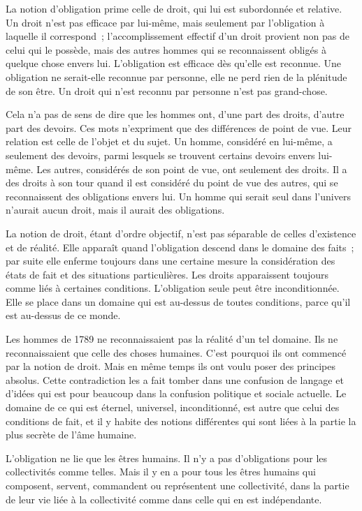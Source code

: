 \documentclass[french,twoside]{book} %
\begin{document}
\noindent La notion d'obligation prime celle de droit, qui lui est subordonnée et relative. Un droit n'est pas efficace par lui-même, mais seulement par l'obligation à laquelle il correspond ; l'accomplissement effectif d'un droit provient non pas de celui qui le possède, mais des autres hommes qui se reconnaissent obligés à quelque chose envers lui. L'obligation est efficace dès qu'elle est reconnue. Une obligation ne serait-elle reconnue par personne, elle ne perd rien de la plénitude de son être. Un droit qui n'est reconnu par personne n'est pas grand-chose.\par
Cela n'a pas de sens de dire que les hommes ont, d'une part des droits, d'autre part des devoirs. Ces mots n'expriment que des différences de point de vue. Leur relation est celle de l'objet et du sujet. Un homme, considéré en lui-même, a seulement des devoirs, parmi lesquels se trouvent certains devoirs envers lui-même. Les autres, considérés de son point de vue, ont seulement des droits. Il a des droits à son tour quand il est considéré du point de vue des autres, qui se reconnaissent des obligations envers lui. Un homme qui serait seul dans l'univers n'aurait aucun droit, mais il aurait des obligations.\par
La notion de droit, étant d'ordre objectif, n'est pas séparable de celles d'existence et de réalité. Elle apparaît quand l'obligation descend dans le domaine des faits ; par suite elle enferme toujours dans une certaine mesure la considération des états de fait et des situations particulières. Les droits apparaissent toujours comme liés à certaines conditions. L'obligation seule peut être inconditionnée. Elle se place dans un domaine qui est au-dessus de toutes conditions, parce qu'il est au-dessus de ce monde.\par
Les hommes de 1789 ne reconnaissaient pas la réalité d'un tel domaine. Ils ne reconnaissaient que celle des choses humaines. C'est pourquoi ils ont commencé par la notion de droit. Mais en même temps ils ont voulu poser des principes absolus. Cette contradiction les a fait tomber dans une confusion de langage et d'idées qui est pour beaucoup dans la confusion politique et sociale actuelle. Le domaine de ce qui est éternel, universel, inconditionné, est autre que celui des conditions de fait, et il y habite des notions différentes qui sont liées à la partie la plus secrète de l'âme humaine.\par
L'obligation ne lie que les êtres humains. Il n'y a pas d'obligations pour les collectivités comme telles. Mais il y en a pour tous les êtres humains qui composent, servent, commandent ou représentent une collectivité, dans la partie de leur vie liée à la collectivité comme dans celle qui en est indépendante.\par
\end{document}
